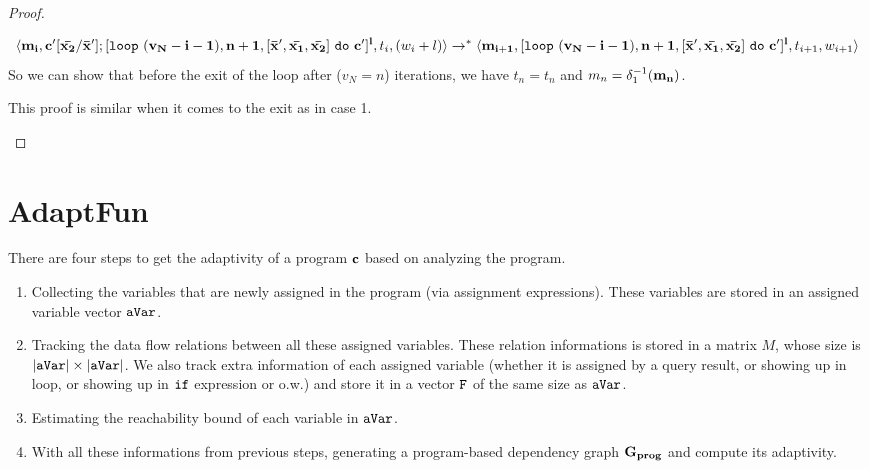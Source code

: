 \documentclass[a4paper,11pt]{article}
\newcommand{\THESYSTEM}{\textsf{AdaptFun}}
\begin{document}
\begin{proof}
\begin{itemize}
{\begin{enumerate}
\[{  }{
  \langle \mathbf{{ {m_i}, c'[ \bar{x_2}/\bar{x}'  ];  [\mathtt{loop} ~ (v_N-i-1), n+1, [\bar{\mathbf{{x}}}', \bar{\mathbf{{x_1}}}, \bar{\mathbf{{x_2}}}] ~  \mathtt{do} ~ c' ]^{l} }},  t_i, (w_i + l)   \rangle  \to^{*} \\ \langle  \mathbf{{{m_{i+1}}, [\mathtt{loop} ~ (v_N-i-1), n+1, [\bar{\mathbf{{x}}}', \bar{\mathbf{{x_1}}}, \bar{\mathbf{{x_2}}}] ~  \mathtt{do} ~ c' ]^{l}}}, t_{i+1}, w_{i+1}   \rangle 
  }
\]
So we can show that before the exit of the loop after ($v_N= n $) iterations, we have $t_{n} = t_{n}$ and $m_{n} = \delta_1^{-1}(\mathbf{{m_{n}}})$.
 \end{enumerate}
%
This proof is similar when it comes to the exit as in case 1. 
}
\end{itemize}
%
\end{proof}
%
%
%
\clearpage
%
%
\section{\THESYSTEM}
There are four steps to get the adaptivity of a program $\mathbf{{c}}$ based on analyzing the program. 
\begin{enumerate}
    \item Collecting the variables that are newly assigned in the program (via assignment expressions). These variables are stored in an assigned variable vector $\mathtt{aVar}$. 
    \item Tracking the data flow relations between all these assigned variables. These relation informations is stored in a matrix $M$, whose size is $|\mathtt{aVar}| \times |\mathtt{aVar}|$. 
    We also track extra information of each assigned variable (whether it is assigned by a query result, or showing up in loop, or showing up in $\mathtt{if}$ expression or o.w.) and store it in a vector $\mathtt{F}$ of the same size as $\mathtt{aVar}$.
    \item Estimating the reachability bound of each variable in $\mathtt{aVar}$.
    \item With all these informations from previous steps, generating a program-based dependency graph $\bf{G_{prog}}$ and compute its adaptivity.
\end{enumerate}
\end{document}
